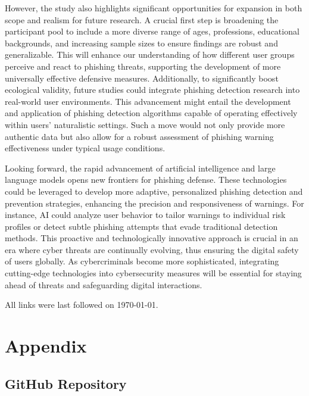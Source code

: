 \documentclass[
  a4paper,  %
  twoside,  %
  bibliography=totoc,
  headsepline,
  cleardoublepage=empty,
  parskip=half,
  draft=false
]{scrbook}
\begin{document}
However, the study also highlights significant opportunities for expansion in both scope and realism for future research. A crucial first step is broadening the participant pool to include a more diverse range of ages, professions, educational backgrounds, and increasing sample sizes to ensure findings are robust and generalizable. This will enhance our understanding of how different user groups perceive and react to phishing threats, supporting the development of more universally effective defensive measures. Additionally, to significantly boost ecological validity, future studies could integrate phishing detection research into real-world user environments. This advancement might entail the development and application of phishing detection algorithms capable of operating effectively within users' naturalistic settings. Such a move would not only provide more authentic data but also allow for a robust assessment of phishing warning effectiveness under typical usage conditions.

Looking forward, the rapid advancement of artificial intelligence and large language models opens new frontiers for phishing defense. These technologies could be leveraged to develop more adaptive, personalized phishing detection and prevention strategies, enhancing the precision and responsiveness of warnings. For instance, AI could analyze user behavior to tailor warnings to individual risk profiles or detect subtle phishing attempts that evade traditional detection methods. This proactive and technologically innovative approach is crucial in an era where cyber threats are continually evolving, thus ensuring the digital safety of users globally. As cybercriminals become more sophisticated, integrating cutting-edge technologies into cybersecurity measures will be essential for staying ahead of threats and safeguarding digital interactions.

%
%


\printbibliography

All links were last followed on \today{}.

\appendix
\chapter{Appendix}

\section{GitHub Repository}
\label{sec:github}
\end{document}
